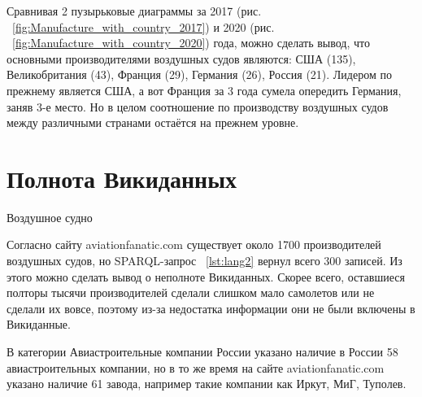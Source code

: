 Сравнивая 2 пузырьковые диаграммы за 2017 (рис. ~\ref{fig:Manufacture_with_country_2017}) и 2020 (рис. ~\ref{fig:Manufacture_with_country_2020}) года, можно сделать вывод, что основными производителями воздушных судов являются: США (135), Великобритания (43), Франция (29), Германия (26), Россия (21). Лидером по прежнему является США, а вот Франция за 3 года сумела опередить Германия, заняв 3-е место. Но в целом соотношение по производству воздушных судов между различными странами остаётся на прежнем уровне.

\section{Полнота Викиданных}

\label{aircraft_question_5}

\begin{marginfigure}[0.0cm]
{
\setlength{\fboxsep}{0pt}%
\setlength{\fboxrule}{1pt}%
%
}
  \caption{Воздушное судно}%
  \label{fig:airship_question_aircraft}%
\end{marginfigure}

Согласно сайту aviationfanatic.com существует около \num{1700} производителей воздушных судов, но SPARQL-запрос ~\ref{lst:lang2} вернул всего 300 записей. Из этого можно сделать вывод о неполноте Викиданных. Скорее всего, оставшиеся полторы тысячи производителей сделали слишком мало самолетов или не сделали их вовсе, поэтому из-за недостатка информации они не были включены в Викиданные.

В категории Авиастроительные компании России указано наличие в России 58 авиастроительных компании, но в то же время на сайте aviationfanatic.com указано наличие 61 завода, например такие компании как Иркут, МиГ, Туполев.



